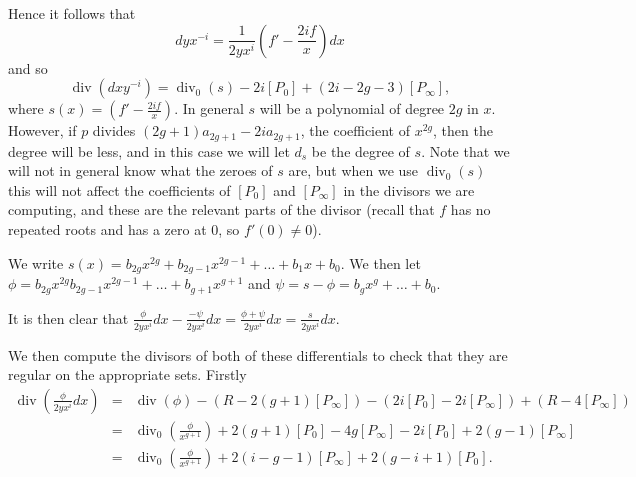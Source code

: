 \documentclass[draft, 11pt]{article} %
\theoremstyle{plain}
\theoremstyle{remark}
\DeclareMathOperator{\di}{div}
\begin{document}
Hence it follows that 
\begin{equation*}
dyx^{-i} = \frac{1}{2yx^{i}}\left( f' - \frac{2if}{x} \right) dx
\end{equation*}
and so
\[
\di (dxy^{-i}) = \di_0(s) -2i[P_0] +(2i-2g-3)[P_\infty],
\]
where $s(x) = \left ( f'-\frac{2if}{x} \right )$.
In general $s$ will be a polynomial of degree $2g$ in $x$.
However, if $p$ divides $(2g+1)a_{2g+1}- 2ia_{2g+1}$, the coefficient of $x^{2g}$, then the degree will be less, and in this case we will let $d_s$ be the degree of $s$.
Note that we will not in general know what the zeroes of $s$ are, but when we use $\di_0(s)$ this will not affect the coefficients of $[P_0]$ and $[P_\infty]$ in the divisors we are computing, and these are the relevant parts of the divisor (recall that $f$ has no repeated roots and has a zero at $0$, so $f'(0) \neq 0$).
\begin{comment}
We could try writing $dyx^{-i}$ as $\frac{1}{2yx^i}dx - (1-s)\frac{1}{2yx^i}dx$.
We then  have 
\[
\di \left( \frac{1}{2yx^i}dx\right) = -\di(y) - \di(x^i) + \di(dx) = (2g+2i-2)[P_\infty] - 2i[P_0]
\]
which has the correct pole at $P_0$ and is otherwise regular.

On the other hand we have
\[
\di\left((1-s)\frac{1}{2yx^i}\right ) dx = \di_0(1-s) -4g[P_\infty] +2(g+i-1)[P_\infty]-2i[P_0] = \di_0(1-s) +2(i-g-1)[P_\infty] - 2i[P_0].
\]

\end{comment}



We write $s(x) = b_{2g}x^{2g} + b_{2g-1}x^{2g-1} + \ldots + b_1x + b_0$.
We then let $\phi = b_{2g} x^{2g} b_{2g-1}x^{2g-1} + \ldots + b_{g+1}x^{g+1} $ and $\psi = s - \phi = b_gx^g + \ldots + b_0$.

It is then clear that $\frac{\phi }{2yx^i}dx - \frac{-\psi}{2yx^i}dx = \frac{\phi + \psi}{2yx^i}dx = \frac{s}{2yx^i}dx$.

We then compute the divisors of both of these differentials to check that they are regular on the appropriate sets.
Firstly
\begin{eqnarray*}
\di\left( \frac{\phi}{2yx^i}dx \right) & = & \di(\phi) - ( R - 2(g+1)[P_\infty]) - (2i[P_0] - 2i[P_\infty]) + (R - 4[P_\infty]) \\
& = & \di_0\left( \frac{\phi}{x^{g+1}}\right) + 2(g+1)[P_0] - 4g[P_\infty] - 2i[P_0] + 2(g-1)[P_\infty] \\
& = & \di_0\left( \frac{\phi}{x^{g+1}} \right) + 2(i-g-1)[P_\infty] + 2(g-i+1)[P_0].
\end{eqnarray*}
\end{document}
